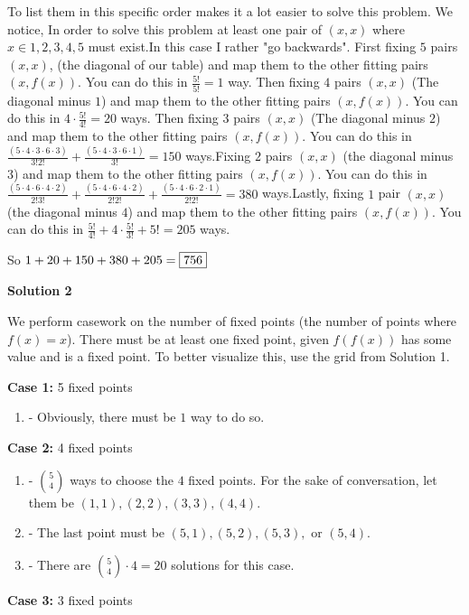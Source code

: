 \begin{enumerate}
 To list them in this specific order makes it a lot easier to solve this problem. We notice, In order to solve this problem at least one pair of $(x,x)$ where $x\in{1,2,3,4,5}$ must exist.In this case I rather "go backwards". First fixing $5$ pairs $(x,x)$, (the diagonal of our table) and map them to the other fitting pairs $(x,f(x))$. You can do this in $\frac{5!}{5!} = 1$ way. Then fixing $4$ pairs $(x,x)$ (The diagonal minus $1$) and map them to the other fitting pairs $(x,f(x))$. You can do this in $4\cdot\frac{5!}{4!} = 20$ ways. Then fixing $3$ pairs $(x,x)$ (The diagonal minus $2$) and map them to the other fitting pairs $(x,f(x))$. You can do this in $\frac{(5\cdot4\cdot3\cdot6\cdot3)}{3!2!} + \frac{(5\cdot4\cdot3\cdot6\cdot1)}{3!} = 150$ ways.Fixing $2$ pairs $(x,x)$ (the diagonal minus $3$) and map them to the other fitting pairs $(x,f(x))$. You can do this in $\frac{(5\cdot4\cdot6\cdot4\cdot2)}{2!3!} + \frac{(5\cdot4\cdot6\cdot4\cdot2)}{2!2!} + \frac{(5\cdot4\cdot6\cdot2\cdot1)}{2!2!} = 380$ ways.Lastly, fixing $1$ pair $(x,x)$ (the diagonal minus $4$) and map them to the other fitting pairs $(x,f(x))$. You can do this in $\frac{5!}{4!} + 4\cdot\frac{5!}{3!} + 5! = 205$ ways.

 So $1 + 20 + 150 + 380 + 205 = \framebox{756}$




\textbf{Solution 2}

We perform casework on the number of fixed points (the number of points where $f(x) = x$). There must be at least one fixed point, given $f(f(x))$ has some value and is a fixed point. To better visualize this, use the grid from Solution 1. 

 \textbf{Case 1:} 5 fixed points

 
            \begin{enumerate}[label=(\roman*)]
                \item - Obviously, there must be $1$ way to do so.
            \end{enumerate}
            \textbf{Case 2:} 4 fixed points

 
            \begin{enumerate}[label=(\roman*)]
                \item - $\binom 54$ ways to choose the $4$ fixed points.  For the sake of conversation, let them be $(1, 1), (2, 2), (3, 3), (4, 4)$.\item - The last point must be $(5, 1), (5, 2), (5, 3),$ or $(5, 4)$.\item - There are $\binom 54 \cdot 4 = 20$ solutions for this case.
            \end{enumerate}
            \textbf{Case 3:} 3 fixed points


\end{enumerate}
